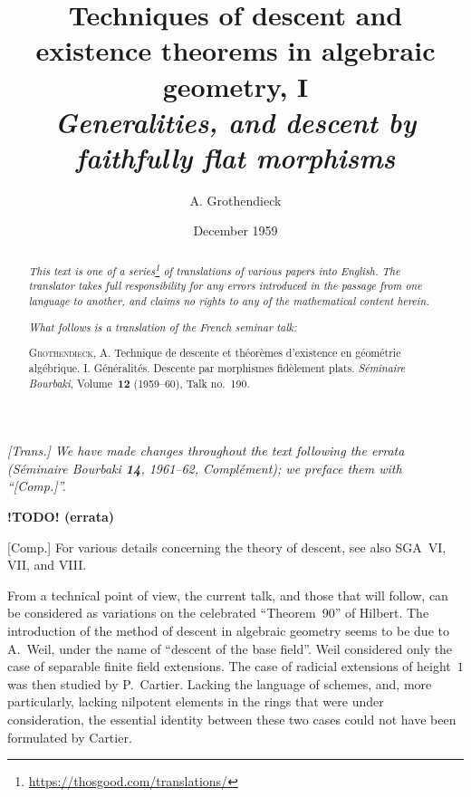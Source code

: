 \documentclass{article}
\title{Techniques of descent and existence theorems in algebraic geometry, I\\\emph{Generalities, and descent by faithfully flat morphisms}}
\author{A. Grothendieck}
\date{December 1959}
\theoremstyle{plain}
\theoremstyle{definition}
\newcommand{\todo}{\textbf{ !TODO! }}
\newcommand{\oldpage}[1]{\marginpar{\footnotesize$\Big\vert$ \textit{p.~#1}}}
\begin{document}
\maketitle
\thispagestyle{fancy}

\renewcommand{\abstractname}{Translator's note.}

\begin{abstract}
  \renewcommand*{\thefootnote}{\fnsymbol{footnote}}
  \emph{This text is one of a series\footnote{\url{https://thosgood.com/translations/}} of translations of various papers into English.}
  \emph{The translator takes full responsibility for any errors introduced in the passage from one language to another, and claims no rights to any of the mathematical content herein.}

  \medskip
  
  \emph{What follows is a translation of the French seminar talk:}

  \medskip\noindent
  \textsc{Grothendieck, A.}
  Technique de descente et th\'{e}or\`{e}mes d'existence en g\'{e}om\'{e}trie alg\'{e}brique. I. G\'{e}n\'{e}ralit\'{e}s. Descente par morphismes fid\`{e}lement plats.
  \emph{S\'{e}minaire Bourbaki}, Volume~\textbf{12} (1959--60), Talk no.~190.
\end{abstract}

\setcounter{footnote}{0}

\setcounter{tocdepth}{1}
\tableofcontents



\subsubsection*{}

\emph{[Trans.] We have made changes throughout the text following the errata (\emph{S\'{e}minaire Bourbaki} \textbf{14}, 1961--62, Compl\'{e}ment); we preface them with ``[Comp.]''.}
\medskip

\textbf{\todo(errata)}

[Comp.] For various details concerning the theory of descent, see also SGA~VI, VII, and VIII.
\medskip

\oldpage{190-01}
From a technical point of view, the current talk, and those that will follow, can be considered as variations on the celebrated ``Theorem~90'' of Hilbert.
The introduction of the method of descent in algebraic geometry seems to be due to A.~Weil, under the name of ``descent of the base field''.
Weil considered only the case of separable finite field extensions.
The case of radicial extensions of height~$1$ was then studied by P.~Cartier.
Lacking the language of schemes, and, more particularly, lacking nilpotent elements in the rings that were under consideration, the essential identity between these two cases could not have been formulated by Cartier.
\end{document}
